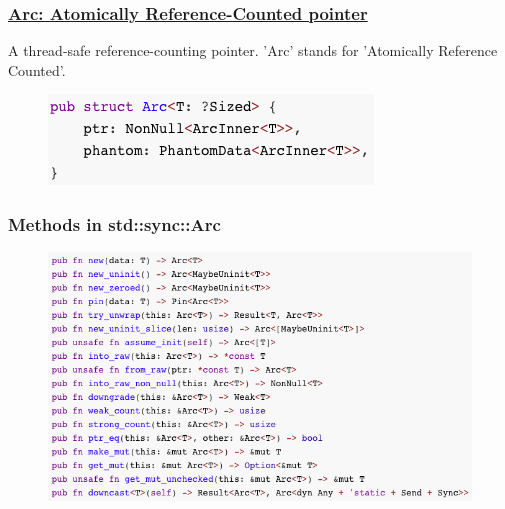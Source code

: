 % 
% 
% 
% 
\begin{frame}[fragile]
    \frametitle{\href{https://doc.rust-lang.org/std/sync/struct.Arc.html}{Arc: Atomically Reference-Counted pointer}}

A thread-safe reference-counting pointer. 'Arc' stands for 'Atomically Reference Counted'. \pause

    \begin{figure}
    \includegraphics[width=0.5\linewidth]{figs/struct-arc.png}
    \end{figure}

\end{frame}
% 
% 
% 
% 
% 
% 
\begin{frame}[fragile]
    \frametitle{Methods in std::sync::Arc}
    \begin{figure}
    \includegraphics[width=0.8\linewidth]{figs/methods-arc.png}
    \end{figure}

\end{frame}
